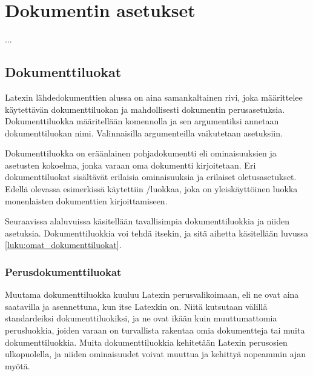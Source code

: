 
\chapter{Dokumentin asetukset}


...

\section{Dokumenttiluokat}
\label{luku:dokumenttiluokat}

Latexin lähdedokumenttien alussa on aina samankaltainen rivi, joka
määrittelee käytettävän dokumenttiluokan ja mahdollisesti dokumentin
pe\-rus\-ase\-tuk\-sia. Dokumenttiluokka määritellään komennolla
 ja sen argumentiksi annetaan
dokumenttiluokan nimi. Valinnaisilla argumenteilla vaikutetaan
asetuksiin.


Dokumenttiluokka on eräänlainen pohjadokumentti eli ominaisuuksien ja
asetusten kokoelma, jonka varaan oma dokumentti kirjoitetaan. Eri
dokumenttiluokat sisältävät erilaisia ominaisuuksia ja erilaiset
oletusasetukset. Edellä olevassa esimerkissä käytettiin
\-/luokkaa, joka on yleiskäyttöinen luokka
monenlaisten dokumenttien kirjoittamiseen.

Seuraavissa alaluvuissa käsitellään tavallisimpia dokumenttiluokkia ja
niiden asetuksia. Dokumenttiluokkia voi tehdä itsekin, ja sitä aihetta
käsitellään luvussa \ref{luku:omat_dokumenttiluokat}.

\subsection{Perusdokumenttiluokat}

Muutama dokumenttiluokka kuuluu Latexin perusvalikoimaan, eli ne ovat
aina saatavilla ja asennettuna, kun itse Latexkin on. Niitä kutsutaan
välillä standardeiksi dokumenttiluokiksi, ja ne ovat ikään kuin
muuttumattomia perusluokkia, joiden varaan on turvallista rakentaa omia
dokumentteja tai muita dokumenttiluokkia. Muita dokumenttiluokkia
kehitetään Latexin perusosien ulkopuolella, ja niiden ominaisuudet
voivat muuttua ja kehittyä nopeammin ajan myötä.

